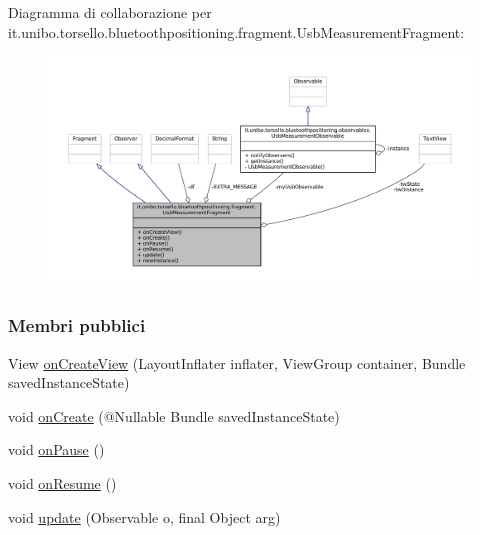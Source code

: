 Diagramma di collaborazione per it.\+unibo.\+torsello.\+bluetoothpositioning.\+fragment.\+Usb\+Measurement\+Fragment\+:
\nopagebreak
\begin{figure}[H]
\begin{center}
\leavevmode
\includegraphics[width=350pt]{classit_1_1unibo_1_1torsello_1_1bluetoothpositioning_1_1fragment_1_1UsbMeasurementFragment__coll__graph}
\end{center}
\end{figure}
\subsubsection*{Membri pubblici}
\begin{DoxyCompactItemize}
\item 
View \hyperlink{classit_1_1unibo_1_1torsello_1_1bluetoothpositioning_1_1fragment_1_1UsbMeasurementFragment_a43be96dbfa04a7c353402ca6ade9ae83_a43be96dbfa04a7c353402ca6ade9ae83}{on\+Create\+View} (Layout\+Inflater inflater, View\+Group container, Bundle saved\+Instance\+State)
\item 
void \hyperlink{classit_1_1unibo_1_1torsello_1_1bluetoothpositioning_1_1fragment_1_1UsbMeasurementFragment_aaa41498cdcda2a717cdc945e6923f2b1_aaa41498cdcda2a717cdc945e6923f2b1}{on\+Create} (@Nullable Bundle saved\+Instance\+State)
\item 
void \hyperlink{classit_1_1unibo_1_1torsello_1_1bluetoothpositioning_1_1fragment_1_1UsbMeasurementFragment_a2d1feb75367ef108f605cccf32a87e73_a2d1feb75367ef108f605cccf32a87e73}{on\+Pause} ()
\item 
void \hyperlink{classit_1_1unibo_1_1torsello_1_1bluetoothpositioning_1_1fragment_1_1UsbMeasurementFragment_a3a1cc1c26b55b36b877a79d2149402b4_a3a1cc1c26b55b36b877a79d2149402b4}{on\+Resume} ()
\item 
void \hyperlink{classit_1_1unibo_1_1torsello_1_1bluetoothpositioning_1_1fragment_1_1UsbMeasurementFragment_abc309a85fe75275173331dbe7a73ab2b_abc309a85fe75275173331dbe7a73ab2b}{update} (Observable o, final Object arg)
\end{DoxyCompactItemize}
